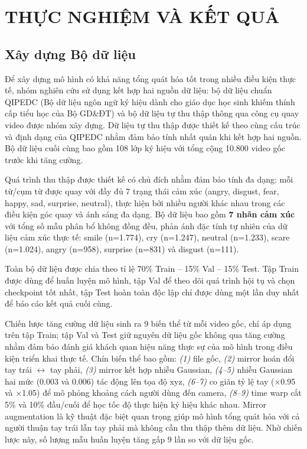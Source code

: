 \chapter{THỰC NGHIỆM VÀ KẾT QUẢ}

\section{Xây dựng Bộ dữ liệu}

Để xây dựng mô hình có khả năng tổng quát hóa tốt trong nhiều điều kiện thực tế,
nhóm nghiên cứu sử dụng kết hợp hai nguồn dữ liệu: bộ dữ liệu chuẩn QIPEDC (Bộ
dữ liệu ngôn ngữ ký hiệu dành cho giáo dục học sinh khiếm thính cấp tiểu học của
Bộ GD\&ĐT) và bộ dữ liệu tự thu thập thông qua công cụ quay video được nhóm xây
dựng. Dữ liệu tự thu thập được thiết kế theo cùng cấu trúc và định dạng của
QIPEDC nhằm đảm bảo tính nhất quán khi kết hợp hai nguồn. Bộ dữ liệu cuối cùng
bao gồm 108 lớp ký hiệu với tổng cộng 10.800 video gốc trước khi tăng cường.

Quá trình thu thập được thiết kế có chủ đích nhằm đảm bảo tính đa dạng: mỗi từ/cụm từ được quay với đầy đủ 7 trạng thái cảm xúc (angry, disgust, fear, happy, sad, surprise, neutral), thực hiện bởi nhiều người khác nhau trong các điều kiện góc quay và ánh sáng đa dạng. Bộ dữ liệu bao gồm \textbf{7 nhãn cảm xúc} với tổng số mẫu phân bổ không đồng đều, phản ánh đặc tính tự nhiên của dữ liệu cảm xúc thực tế: smile (n=1.774), cry (n=1.247), neutral (n=1.233), scare (n=1.024), angry (n=958), surprise (n=831) và disgust (n=111).

Toàn bộ dữ liệu được chia theo tỉ lệ 70\% Train -- 15\% Val -- 15\% Test.
Tập Train được dùng để huấn luyện mô hình, tập Val để theo dõi quá trình hội tụ
và chọn checkpoint tốt nhất, tập Test hoàn toàn độc lập chỉ được dùng một lần
duy nhất để báo cáo kết quả cuối cùng.

Chiến lược tăng cường dữ liệu sinh ra 9 biến thể từ mỗi video gốc, chỉ áp dụng
trên tập Train; tập Val và Test giữ nguyên dữ liệu gốc không qua tăng cường nhằm
đảm bảo đánh giá khách quan hiệu năng thực sự của mô hình trong điều kiện triển
khai thực tế. Chín biến thể bao gồm:
\textit{(1)} file gốc,
\textit{(2)} mirror hoán đổi tay trái $\leftrightarrow$ tay phải,
\textit{(3)} mirror kết hợp nhiễu Gaussian,
\textit{(4--5)} nhiễu Gaussian hai mức (0.003 và 0.006) tác động lên tọa độ xyz,
\textit{(6--7)} co giãn tỷ lệ tay ($\times$0.95 và $\times$1.05) để mô phỏng
khoảng cách người dùng đến camera,
\textit{(8--9)} time warp cắt 5\% và 10\% đầu/cuối để học tốc độ thực hiện
ký hiệu khác nhau.
Mirror augmentation là kỹ thuật đặc biệt quan trọng giúp mô hình tổng quát hóa
với cả người thuận tay trái lẫn tay phải mà không cần thu thập thêm dữ liệu.
Nhờ chiến lược này, số lượng mẫu huấn luyện tăng gấp 9 lần so với dữ liệu gốc.

